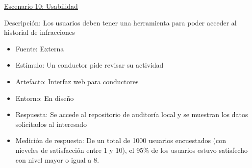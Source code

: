 \underline{Escenario 10: Usabilidad}


Descripción: Los usuarios deben tener una herramienta para poder acceder al historial de infracciones 
\begin{itemize}
\item Fuente: Externa
\item Estímulo: Un conductor pide revisar su actividad
\item Artefacto: Interfaz web para conductores 
\item Entorno: En diseño 
\item Respuesta: Se accede al repositorio de auditoría local y se muestran los datos solicitados al interesado
\item Medición de respuesta: De un total de 1000 usuarios encuestados (con nieveles de satisfacción entre 1 y 10), el 95\% de los usuarios estuvo satisfecho con nivel mayor o igual a 8. 
\end{itemize} 

